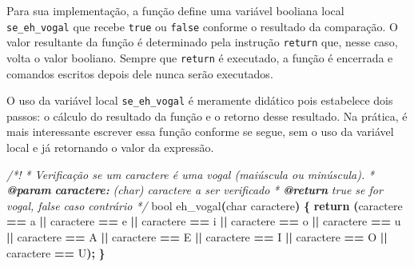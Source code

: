 \documentclass[
  11pt,
  a4paper,
]{scrbook}
\newenvironment{Shaded}{\begin{snugshade}}{\end{snugshade}}
\newcommand{\AnnotationTok}[1]{\textcolor[rgb]{0.56,0.35,0.01}{\textbf{\textit{#1}}}}
\newcommand{\CharTok}[1]{\textcolor[rgb]{0.31,0.60,0.02}{#1}}
\newcommand{\CommentTok}[1]{\textcolor[rgb]{0.56,0.35,0.01}{\textit{#1}}}
\newcommand{\CommentVarTok}[1]{\textcolor[rgb]{0.56,0.35,0.01}{\textbf{\textit{#1}}}}
\newcommand{\ControlFlowTok}[1]{\textcolor[rgb]{0.13,0.29,0.53}{\textbf{#1}}}
\newcommand{\DataTypeTok}[1]{\textcolor[rgb]{0.13,0.29,0.53}{#1}}
\newcommand{\NormalTok}[1]{#1}
\newcommand{\OperatorTok}[1]{\textcolor[rgb]{0.81,0.36,0.00}{\textbf{#1}}}
\begin{document}
Para sua implementação, a função define uma variável booliana local
\texttt{se\_eh\_vogal} que recebe \texttt{true} ou \texttt{false}
conforme o resultado da comparação. O valor resultante da função é
determinado pela instrução \texttt{return} que, nesse caso, volta o
valor booliano. Sempre que \texttt{return} é executado, a função é
encerrada e comandos escritos depois dele nunca serão executados.

O uso da variável local \texttt{se\_eh\_vogal} é meramente didático pois
estabelece dois passos: o cálculo do resultado da função e o retorno
desse resultado. Na prática, é mais interessante escrever essa função
conforme se segue, sem o uso da variável local e já retornando o valor
da expressão.

\begin{Shaded}
\begin{Highlighting}[]
\CommentTok{/*!}
\CommentTok{ * Verificação se um caractere é uma vogal (maiúscula ou minúscula).}
\CommentTok{ * }\AnnotationTok{@param}\CommentTok{ }\CommentVarTok{caractere:}\CommentTok{ (char) caractere a ser verificado}
\CommentTok{ * }\AnnotationTok{@return}\CommentTok{ true se for vogal, false caso contrário}
\CommentTok{ */}
\DataTypeTok{bool}\NormalTok{ eh\_vogal}\OperatorTok{(}\DataTypeTok{char}\NormalTok{ caractere}\OperatorTok{)} \OperatorTok{\{}
    \ControlFlowTok{return} \OperatorTok{(}\NormalTok{caractere }\OperatorTok{==} \CharTok{\textquotesingle{}a\textquotesingle{}} \OperatorTok{||}\NormalTok{ caractere }\OperatorTok{==} \CharTok{\textquotesingle{}e\textquotesingle{}} \OperatorTok{||}\NormalTok{ caractere }\OperatorTok{==} \CharTok{\textquotesingle{}i\textquotesingle{}} \OperatorTok{||}
\NormalTok{            caractere }\OperatorTok{==} \CharTok{\textquotesingle{}o\textquotesingle{}} \OperatorTok{||}\NormalTok{ caractere }\OperatorTok{==} \CharTok{\textquotesingle{}u\textquotesingle{}} \OperatorTok{||}\NormalTok{ caractere }\OperatorTok{==} \CharTok{\textquotesingle{}A\textquotesingle{}} \OperatorTok{||}
\NormalTok{            caractere }\OperatorTok{==} \CharTok{\textquotesingle{}E\textquotesingle{}} \OperatorTok{||}\NormalTok{ caractere }\OperatorTok{==} \CharTok{\textquotesingle{}I\textquotesingle{}} \OperatorTok{||}\NormalTok{ caractere }\OperatorTok{==} \CharTok{\textquotesingle{}O\textquotesingle{}} \OperatorTok{||}
\NormalTok{            caractere }\OperatorTok{==} \CharTok{\textquotesingle{}U\textquotesingle{}}\OperatorTok{);}
\OperatorTok{\}}
\end{Highlighting}
\end{Shaded}
\end{document}
